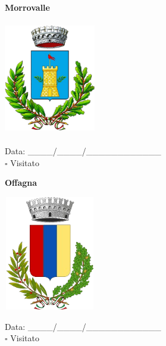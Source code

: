 \documentclass[a5paper,12pt]{article}
\begin{document}
\newpage

\noindent
\begin{minipage}[t]{0.45\textwidth}
    \begin{center}
        \textbf{Morrovalle}
    \end{center}
    \vspace{-0.5cm} %
    \begin{center}
        \includegraphics[height= 5cm, width=4cm]{Marche/Stemma Morrovalle.png}
    \end{center}
    \vspace{-0.4cm} %
    \begin{flushleft}
        Data: \_\_\_\_/\_\_\_\_/\_\_\_\_\_\_\_\_\_\_\_\_ \\
        $\square$ Visitato
    \end{flushleft}
\end{minipage}
\hfill
\noindent
\begin{minipage}[t]{0.45\textwidth}
    \begin{center}
        \textbf{Offagna}
    \end{center}
    \vspace{-0.5cm} %
    \begin{center}
        \includegraphics[height= 5cm, width=4cm]{Marche/Stemma Offagna.png}
    \end{center}
    \vspace{-0.4cm} %
    \begin{flushleft}
        Data: \_\_\_\_/\_\_\_\_/\_\_\_\_\_\_\_\_\_\_\_\_ \\
        $\square$ Visitato
    \end{flushleft}
\end{minipage}
\end{document}
